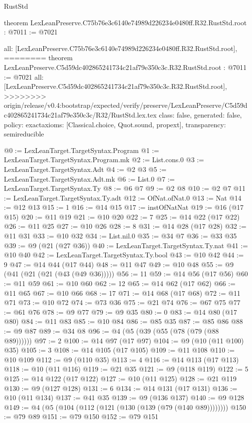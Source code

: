 \begin{lexlean}{RustStd}
\begin{coremodule}
{\begin{coremodule}
{{{{{{{{{theorem LexLeanPreserve.C75b76e3c6140e74989d226234e0480ff.R32.RustStd.root : @7011 := @7021 {
  all: [LexLeanPreserve.C75b76e3c6140e74989d226234e0480ff.R32.RustStd.root],
========
theorem LexLeanPreserve.C5d59dc402865241734c21af79e350c3c.R32.RustStd.root : @7011 := @7021 {
  all: [LexLeanPreserve.C5d59dc402865241734c21af79e350c3c.R32.RustStd.root],
>>>>>>>> origin/release/v0.4:bootstrap/expected/verify/preserve/LexLeanPreserve/C5d59dc402865241734c21af79e350c3c/R32/RustStd.lex.tex
  class: false,
  generated: false,
  policy: exact{axioms: [Classical.choice, Quot.sound, propext]},
  transparency: semireducible
}

@0 := LexLeanTarget.TargetSyntax.Program
@1 := LexLeanTarget.TargetSyntax.Program.mk
@2 := List.cons.{0}
@3 := LexLeanTarget.TargetSyntax.Adt
@4 := @2 @3
@5 := LexLeanTarget.TargetSyntax.Adt.mk
@6 := List.{0}
@7 := LexLeanTarget.TargetSyntax.Ty
@8 := @6 @7
@9 := @2 @8
@10 := @2 @7
@11 := LexLeanTarget.TargetSyntax.Ty.adt
@12 := OfNat.ofNat.{0}
@13 := Nat
@14 := @12 @13
@15 := 1
@16 := @14 @15
@17 := instOfNatNat
@19 := @16 (@17 @15)
@20 := @11 @19
@21 := @10 @20
@22 := 7
@25 := @14 @22 (@17 @22)
@26 := @11 @25
@27 := @10 @26
@28 := 8
@31 := @14 @28 (@17 @28)
@32 := @11 @31
@33 := @10 @32
@34 := List.nil.{0}
@35 := @34 @7
@36 := @33 @35
@39 := @9 (@21 (@27 @36))
@40 := LexLeanTarget.TargetSyntax.Ty.nat
@41 := @10 @40
@42 := LexLeanTarget.TargetSyntax.Ty.bool
@43 := @10 @42
@44 := 9
@47 := @14 @44 (@17 @44)
@48 := @11 @47
@49 := @10 @48
@55 := @9 (@41 (@21 (@21 (@43 (@49 @36)))))
@56 := 11
@59 := @14 @56 (@17 @56)
@60 := @11 @59
@61 := @10 @60
@62 := 12
@65 := @14 @62 (@17 @62)
@66 := @11 @65
@67 := @10 @66
@68 := 17
@71 := @14 @68 (@17 @68)
@72 := @11 @71
@73 := @10 @72
@74 := @73 @36
@75 := @21 @74
@76 := @67 @75
@77 := @61 @76
@78 := @9 @77
@79 := @9 @35
@80 := 0
@83 := @14 @80 (@17 @80)
@84 := @11 @83
@85 := @10 @84
@86 := @85 @35
@87 := @85 @86
@88 := @9 @87
@89 := @34 @8
@96 := @4 (@5 (@39 (@55 (@78 (@79 (@88 @89))))))
@97 := 2
@100 := @14 @97 (@17 @97)
@104 := @9 (@10 (@11 @100) @35)
@105 := 3
@108 := @14 @105 (@17 @105)
@109 := @11 @108
@110 := @10 @109
@112 := @9 (@110 @35)
@113 := 4
@116 := @14 @113 (@17 @113)
@118 := @10 (@11 @116)
@119 := @21 @35
@121 := @9 (@118 @119)
@122 := 5
@125 := @14 @122 (@17 @122)
@127 := @10 (@11 @125)
@128 := @21 @119
@130 := @9 (@127 @128)
@131 := 6
@134 := @14 @131 (@17 @131)
@136 := @10 (@11 @134)
@137 := @41 @35
@139 := @9 (@136 @137)
@140 := @9 @128
@149 := @4 (@5 (@104 (@112 (@121 (@130 (@139 (@79 (@140 @89))))))))
@150 := @79 @89
@151 := @79 @150
@152 := @79 @151
}}}}}}}}}}
\end{coremodule}}
\end{coremodule}
\end{lexlean}
